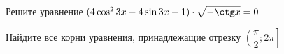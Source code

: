 \begin{ex}
	\begin{condition}
		\begin{enumcols}[label=\asbuk*)]
			\item Решите уравнение \( (4\cos^2 3x - 4\sin 3x - 1)\cdot \sqrt{-\ctg x} = 0 \)
			\item Найдите все корни уравнения, принадлежащие отрезку \( \left(\dfrac{\pi}{2};2\pi\right] \)
		\end{enumcols}
	\end{condition}
\end{ex}